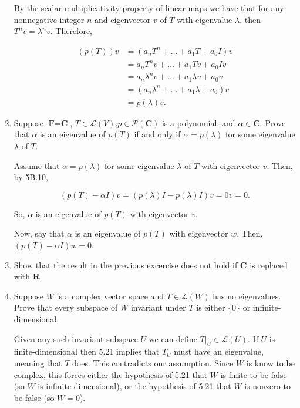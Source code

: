 \documentclass{book}
\begin{document}
\begin{enumerate}
By the scalar multiplicativity property of linear maps we have that for any nonnegative integer \(n\) and eigenvector \(v\) of \(T\) with eigenvalue \(\lambda\), then \(T^n v=\lambda^n v\).  Therefore,

\begin{equation*}
    \begin{split}
        \left(p(T)\right)v &= (a_nT^n+\dots+a_1T+a_0I)v \\
        &= a_nT^nv + \dots + a_1Tv + a_0Iv \\
        &= a_n\lambda^nv + \dots + a_1\lambda v + a_0v \\
        &= (a_n\lambda^n + \dots + a_1\lambda + a_0)v \\
        &= p(\lambda)v.
    \end{split}
\end{equation*}

\item Suppose \(\textbf{F}=\textbf{C}\), \(T \in \mathcal{L}(V)\),\(p \in \mathcal{P}(\textbf{C})\) is a polynomial, and \(\alpha \in \textbf{C}\).  Prove that \(\alpha\) is an eigenvalue of \(p(T)\) if and only if \(\alpha=p(\lambda)\) for some eigenvalue \(\lambda\) of \(T\).

Assume that \(\alpha=p(\lambda)\) for some eigenvalue \(\lambda\) of \(T\) with eigenvector \(v\).  Then, by 5B.10,

\begin{equation*}
    (p(T)-\alpha I)v = (p(\lambda) I-p(\lambda) I)v=0v=0.
\end{equation*}

So, \(\alpha\) is an eigenvalue of \(p(T)\) with eigenvector \(v\).

Now, say that \(\alpha\) is an eigenvalue of \(p(T)\) with eigenvector \(w\).  Then, \((p(T)-\alpha I)w=0\).  

\item Show that the result in the previous excercise does not hold if \(\textbf{C}\) is replaced with \(\textbf{R}\).

\item Suppose \(W\) is a complex vector space and \(T \in \mathcal{L}(W)\) has no eigenvalues.  Prove that every subspace of \(W\) invariant under \(T\) is either \(\{0\}\) or infinite-dimensional.

Given any such invariant subspace \(U\) we can define \(T|_U \in \mathcal{L}(U)\).  If \(U\) is finite-dimensional then 5.21 implies that \(T_U\) must have an eigenvalue, meaning that \(T\) does.  This contradicts our assumption.  Since \(W\) is know to be complex, this forces either the hypothesis of 5.21 that \(W\) is finite-to be false (so \(W\) is infinite-dimensional), or the hypothesis of 5.21 that \(W\) is nonzero to be false (so \(W=0\)).


\end{enumerate}
\end{document}
